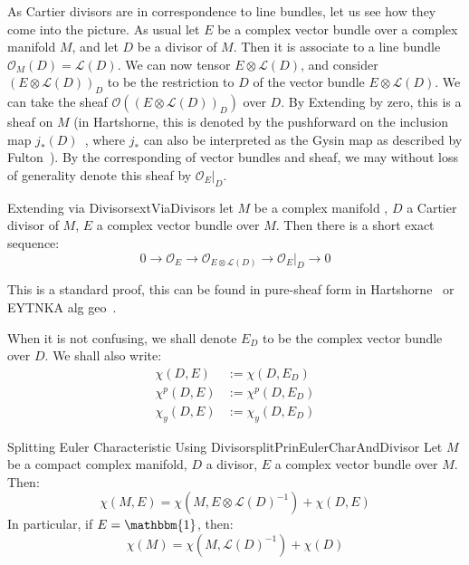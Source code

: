 \documentclass{book}
\newcommand{\CL}{{\mathcal{L}}}
\newcommand{\CO}{{\mathcal{O}}}
\begin{document}
As Cartier divisors are in correspondence to line bundles, let us see how they come into the picture. As usual
let $E$ be a complex vector bundle over a complex manifold $M$, and let $D$ be a  divisor of $M$.
Then it is associate to a line bundle $\CO_M(D) = \CL(D)$. We can now tensor $E\otimes \CL(D)$, and consider
$(E\otimes \CL(D))_D$ to be the restriction to $D$ of the vector bundle $E\otimes \CL(D)$. We can take the
sheaf $\CO((E\otimes \CL(D))_D)$ over $D$. By Extending by zero, this is a sheaf on $M$ (in Hartshorne, this
is denoted by the pushforward on the inclusion map $j_*(D)$~\cite{hartshorneAlgebraicGeometry2013}, where
$j_*$ can also be interpreted as the Gysin map as described by Fulton~\cite{fultonIntersectionTheory1984}). By
the corresponding of vector bundles and sheaf, we may without loss of generality denote this sheaf by
$\CO_{E}|_D$.

\begin{thm}{Extending via Divisors}{extViaDivisors}
  let $M$ be a complex manifold , $D$ a  Cartier divisor of $M$, $E$ a complex vector bundle over
  $M$. Then there is a short exact sequence:
  \[
    0 \to \CO_E \to \CO_{E\otimes \CL(D)} \to \CO_{E}|_D \to 0
  \]
\end{thm}

\begin{Proof}
  This is a standard proof, this can be found in pure-sheaf form in
  Hartshorne~\cite[chapter~2]{hartshorneAlgebraicGeometry2013} or EYTNKA alg geo~\cite{NateAlgGeo}.
\end{Proof}

When it is not confusing, we shall denote $E_D$ to be the complex vector bundle over $D$. We shall also write:
\begin{align*}
  \chi(D, E) &:= \chi(D, E_D)\\
  \chi^p(D, E) &:= \chi^p(D, E_D)\\
  \chi_y(D, E) &:= \chi_y(D, E_D)
\end{align*}
\begin{thm}{Splitting Euler Characteristic Using Divisor}{splitPrinEulerCharAndDivisor}
  Let $M$ be a compact complex manifold, $D$ a  divisor, $E$ a complex vector bundle over $M$. Then:
  \[
    \chi(M,E) = \chi(M, E\otimes \CL(D)^{-1}) + \chi(D, E)
  \]
  In particular, if $E = \mathbbm{1}$, then:
  \[
    \chi(M) = \chi(M, \CL(D)^{-1}) + \chi(D)
  \]
\end{thm}
\end{document}
